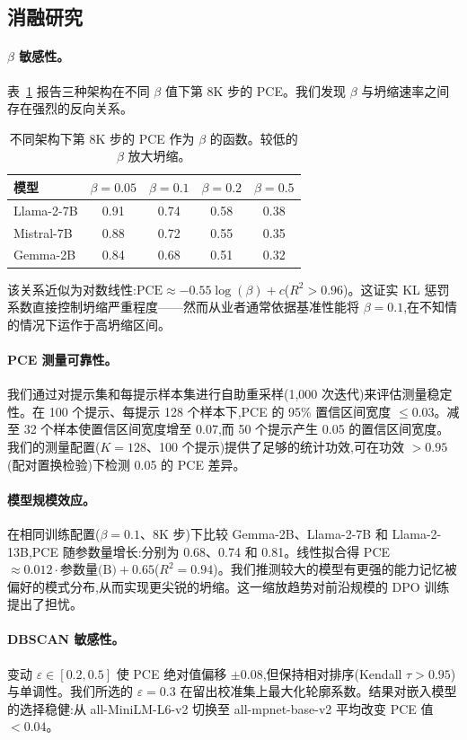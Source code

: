 \subsection{消融研究}
\label{sec:ablations}

\paragraph{$\beta$ 敏感性。} 表~\ref{tab:beta_ablation} 报告三种架构在不同 $\beta$ 值下第 8K 步的 PCE。我们发现 $\beta$ 与坍缩速率之间存在强烈的反向关系。

\begin{table}[t]
\centering
\caption{不同架构下第 8K 步的 PCE 作为 $\beta$ 的函数。较低的 $\beta$ 放大坍缩。}
\label{tab:beta_ablation}
\small
\begin{tabular}{@{}lcccc@{}}
\toprule
模型 & $\beta = 0.05$ & $\beta = 0.1$ & $\beta = 0.2$ & $\beta = 0.5$ \\
\midrule
Llama-2-7B  & 0.91 & 0.74 & 0.58 & 0.38 \\
Mistral-7B  & 0.88 & 0.72 & 0.55 & 0.35 \\
Gemma-2B    & 0.84 & 0.68 & 0.51 & 0.32 \\
\bottomrule
\end{tabular}
\end{table}

该关系近似为对数线性:$\text{PCE} \approx -0.55 \log(\beta) + c$($R^2 > 0.96$)。这证实 KL 惩罚系数直接控制坍缩严重程度——然而从业者通常依据基准性能将 $\beta = 0.1$,在不知情的情况下运作于高坍缩区间。

\paragraph{PCE 测量可靠性。} 我们通过对提示集和每提示样本集进行自助重采样(1{,}000 次迭代)来评估测量稳定性。在 100 个提示、每提示 128 个样本下,PCE 的 95\% 置信区间宽度 $\leq 0.03$。减至 32 个样本使置信区间宽度增至 0.07,而 50 个提示产生 0.05 的置信区间宽度。我们的测量配置($K = 128$、100 个提示)提供了足够的统计功效,可在功效 $> 0.95$(配对置换检验)下检测 0.05 的 PCE 差异。

\paragraph{模型规模效应。} 在相同训练配置($\beta = 0.1$、8K 步)下比较 Gemma-2B、Llama-2-7B 和 Llama-2-13B,PCE 随参数量增长:分别为 0.68、0.74 和 0.81。线性拟合得 PCE $\approx 0.012 \cdot \text{参数量(B)} + 0.65$($R^2 = 0.94$)。我们推测较大的模型有更强的能力记忆被偏好的模式分布,从而实现更尖锐的坍缩。这一缩放趋势对前沿规模的 DPO 训练提出了担忧。

\paragraph{DBSCAN 敏感性。} 变动 $\varepsilon \in [0.2, 0.5]$ 使 PCE 绝对值偏移 $\pm 0.08$,但保持相对排序(Kendall $\tau > 0.95$)与单调性。我们所选的 $\varepsilon = 0.3$ 在留出校准集上最大化轮廓系数。结果对嵌入模型的选择稳健:从 all-MiniLM-L6-v2 切换至 all-mpnet-base-v2 平均改变 PCE 值 $< 0.04$。
